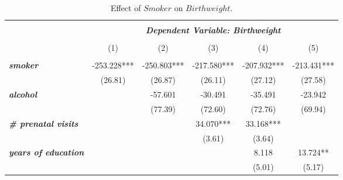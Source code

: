 \documentclass{article}
\begin{document}
\begin{table}[hp!]
\centering
\caption{Effect of $Smoker$ on $Birthweight$.}\vspace{.25cm}
\begin{adjustbox}{width=1\textwidth}
\begin{tabular}{l|ccccc|}
\cline{2-6}
\multicolumn{1}{c|}{\textit{}}                                         & \multicolumn{5}{c|}{\textit{}}   \\
\multicolumn{1}{c|}{\textit{}}                                         & \multicolumn{5}{c|}{\textit{\textbf{Dependent Variable: Birthweight}}}   \\
\multicolumn{1}{c|}{\textit{}}                                         & \multicolumn{5}{c|}{\textit{}}   \\
\textit{\textbf{}}                                                     & (1)         & (2)         & (3)         & (4)         & (5)              \\ \multicolumn{1}{c|}{\textit{}}                                         & \multicolumn{5}{c|}{\textit{}}   \\
\hline
\multicolumn{1}{|l|}{\textit{\textbf{smoker}}}                         & -253.228*** & -250.803*** & -217.580*** & -207.932*** & -213.431***      \\
\multicolumn{1}{|l|}{\textit{\textbf{}}}                               & (26.81)     & (26.87)     & (26.11)     & (27.12)     & (27.58)          \\
\multicolumn{1}{|l|}{\textit{\textbf{alcohol}}}                        &             & -57.601     & -30.491     & -35.491     & -23.942          \\
\multicolumn{1}{|l|}{\textit{\textbf{}}}                               &             & (77.39)     & (72.60)     & (72.76)     & (69.94)          \\
\multicolumn{1}{|l|}{\textit{\textbf{\# prenatal visits}}}             &             &             & 34.070***   & 33.168***   &                  \\
\multicolumn{1}{|l|}{\textit{\textbf{}}}                               &             &             & (3.61)      & (3.64)      &                  \\
\multicolumn{1}{|l|}{\textit{\textbf{years of education}}}             &             &             &             & 8.118       & 13.724**         \\
\multicolumn{1}{|l|}{\textit{\textbf{}}}                               &             &             &             & (5.01)      & (5.17)           \\

\end{tabular}
\end{adjustbox}
\end{table}
\end{document}
